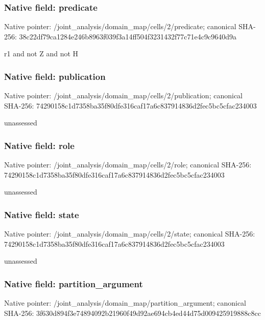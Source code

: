 \documentclass[10pt,a4paper]{article}
\begin{document}
\subsubsection{Native field: predicate}
Native pointer: /joint\_\allowbreak{}analysis/domain\_\allowbreak{}map/cells/2/predicate; canonical SHA-256: 38c22df79ca1284e246b8963f039f3a14ff504f3231432f77c71e4c9c9640d9a

\begingroup\raggedright\sloppy r1 and not Z and not H\par\endgroup

\subsubsection{Native field: publication}
Native pointer: /joint\_\allowbreak{}analysis/domain\_\allowbreak{}map/cells/2/publication; canonical SHA-256: 74290158c1d7358ba35f80dfe316caf17a6c837914836d2fec5bc5cfac234003

\begingroup\raggedright\sloppy unassessed\par\endgroup

\subsubsection{Native field: role}
Native pointer: /joint\_\allowbreak{}analysis/domain\_\allowbreak{}map/cells/2/role; canonical SHA-256: 74290158c1d7358ba35f80dfe316caf17a6c837914836d2fec5bc5cfac234003

\begingroup\raggedright\sloppy unassessed\par\endgroup

\subsubsection{Native field: state}
Native pointer: /joint\_\allowbreak{}analysis/domain\_\allowbreak{}map/cells/2/state; canonical SHA-256: 74290158c1d7358ba35f80dfe316caf17a6c837914836d2fec5bc5cfac234003

\begingroup\raggedright\sloppy unassessed\par\endgroup

\subsubsection{Native field: partition\_\allowbreak{}argument}
Native pointer: /joint\_\allowbreak{}analysis/domain\_\allowbreak{}map/partition\_\allowbreak{}argument; canonical SHA-256: 3f630d894f3e74894092b21960f49d92ae694cb4ed44d75d009425919888c8cc
\end{document}
